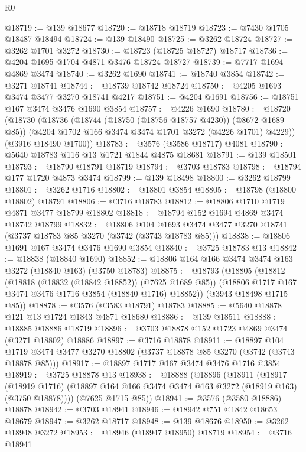 \begin{lexlean}{R0}
\begin{coremodule}
@18719 := @139 @18677
@18720 := @18718 @18719
@18723 := @7430 @1705 @18487 @18494
@18724 := @139 @18490
@18725 := @3262 @18724
@18727 := @3262 @1701 @3272
@18730 := @18723 (@18725 @18727) @18717
@18736 := @4204 @1695 @1704 @4871 @3476 @18724 @18727
@18739 := @7717 @1694 @4869 @3474
@18740 := @3262 @1690
@18741 := @18740 @3854
@18742 := @3271 @18741
@18744 := @18739 @18742 @18724
@18750 := @4205 @1693 @3474 @3477 @3270 @18741 @4217
@18751 := @4204 @1691
@18756 := @18751 @167 @3474 @3476 @1690 @3854
@18757 := @4226 @1690
@18780 := @18720
    (@18730
      (@18736
        (@18744 (@18750 (@18756 @18757 @4230)) (@8672 @1689 @85))
        (@4204 @1702 @166 @3474 @3474 @1701 @3272 (@4226 @1701) @4229))
      (@3916 @18490 @1700))
@18783 := @3576 (@3586 @18717) @4081
@18790 := @5640 @18783 @116 @13 @1721 @1844 @4875 @18681
@18791 := @139 @18501
@18793 := @18790 @18791 @18719
@18794 := @3703 @18783
@18798 := @18794 @177 @1720 @4873 @3474
@18799 := @139 @18498
@18800 := @3262 @18799
@18801 := @3262 @1716
@18802 := @18801 @3854
@18805 := @18798 (@18800 @18802) @18791
@18806 := @3716 @18783
@18812 := @18806 @1710 @1719 @4871 @3477 @18799 @18802
@18818 := @18794 @152 @1694 @4869 @3474 @18742 @18799
@18832 := @18806
    @104
    @1693
    @3474
    @3477
    @3270
    @18741
    (@3737 @18783 @85 @3270 (@3742 (@3743 @18783 @85)))
@18838 := @18806 @1691 @167 @3474 @3476 @1690 @3854
@18840 := @3725 @18783 @13
@18842 := @18838 (@18840 @1690)
@18852 := @18806 @164 @166 @3474 @3474 @163 @3272 (@18840 @163) (@3750 @18783)
@18875 := @18793
    (@18805
      (@18812
        (@18818 (@18832 (@18842 @18852)) (@7625 @1689 @85))
        (@18806 @1717 @167 @3474 @3476 @1716 @3854 (@18840 @1716) @18852))
      (@3943 @18498 @1715 @85))
@18878 := @3576 (@3583 @18791) @18783
@18885 := @5640 @18878 @121 @13 @1724 @1843 @4871 @18680
@18886 := @139 @18511
@18888 := @18885 @18886 @18719
@18896 := @3703 @18878 @152 @1723 @4869 @3474 (@3271 @18802) @18886
@18897 := @3716 @18878
@18911 := @18897
    @104
    @1719
    @3474
    @3477
    @3270
    @18802
    (@3737 @18878 @85 @3270 (@3742 (@3743 @18878 @85)))
@18917 := @18897 @1717 @167 @3474 @3476 @1716 @3854
@18919 := @3725 @18878 @13
@18938 := @18888
    (@18896
      (@18911
        (@18917
          (@18919 @1716)
          (@18897 @164 @166 @3474 @3474 @163 @3272 (@18919 @163) (@3750 @18878))))
      (@7625 @1715 @85))
@18941 := @3576 (@3580 @18886) @18878
@18942 := @3703 @18941
@18946 := @18942 @751 @1842 @18653 @18679
@18947 := @3262 @18717
@18948 := @139 @18676
@18950 := @3262 @18948 @3272
@18953 := @18946 (@18947 @18950) @18719
@18954 := @3716 @18941

\end{coremodule}
\end{lexlean}
